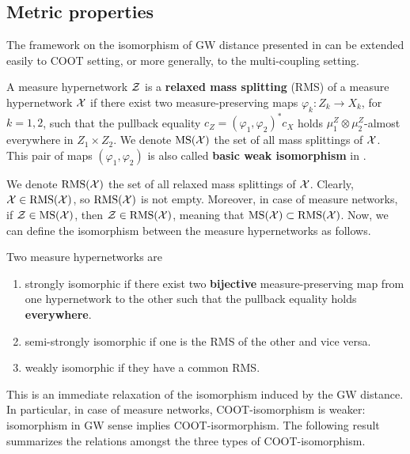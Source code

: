 \subsection{Metric properties}
The framework on the isomorphism of GW distance presented in 
can be extended easily to COOT setting, or more generally, to the multi-coupling setting.
\begin{definition}
  A measure hypernetwork $\mathcal Z$ is a \textbf{relaxed mass splitting} (RMS) of a
  measure hypernetwork $\mathcal X$ if there exist two measure-preserving maps
  $\varphi_k: Z_k \to X_k$, for $k=1,2$, such that the pullback equality
  $c_Z = (\varphi_1, \varphi_2)^*c_X$ holds $\mu^Z_1 \otimes \mu_2^Z$-almost everywhere
  in $Z_1 \times Z_2$. We denote $\text{MS}(\mathcal X)$ the set of all mass splittings
  of $\mathcal X$. This pair of maps $(\varphi_1, \varphi_2)$ is also called
  \textbf{basic weak isomorphism} in \citep{Chowdhury21b}.
\end{definition}
We denote $\text{RMS}(\mathcal X)$ the set of all relaxed mass splittings of $\mathcal X$. Clearly,
$\mathcal X \in \text{RMS}(\mathcal X)$, so $\text{RMS}(\mathcal X)$ is not empty.
Moreover, in case of measure networks, if $\mathcal Z \in \text{MS}(\mathcal X)$, then $\mathcal Z \in \text{RMS}(\mathcal X)$, meaning that
$\text{MS}(\mathcal X) \subset \text{RMS}(\mathcal X)$. Now, we can define the isomorphism between the measure hypernetworks
as follows.
\begin{definition} \label{coot_isomorphic}
  Two measure hypernetworks are
  \begin{enumerate}
    \item strongly isomorphic if there exist two \textbf{bijective}
    measure-preserving map from one hypernetwork to the other such that the pullback equality holds
    \textbf{everywhere}.
    \item semi-strongly isomorphic if one is the RMS of the other and vice versa.
    \item weakly isomorphic if they have a common RMS.
  \end{enumerate}
\end{definition}
This is an immediate relaxation of the isomorphism induced by the GW distance.
In particular, in case of measure networks, COOT-isomorphism is weaker:
isomorphism in GW sense implies COOT-isormorphism. The following result summarizes the relations
amongst the three types of COOT-isomorphism.

